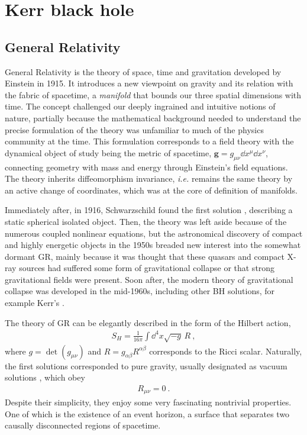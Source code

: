 
\chapter{Kerr black hole} %
\label{Chapter2}


\section{General Relativity}

General Relativity is the theory of space, time and gravitation developed by Einstein in 1915. 
It introduces a new viewpoint on gravity and its relation with the fabric of spacetime, a \emph{manifold} that bounds our three spatial dimensions with time.
The concept challenged our deeply ingrained and intuitive notions of nature, partially because the mathematical background needed to understand the precise formulation of the theory was unfamiliar to much of the physics community at the time.
This formulation corresponds to a field theory with the dynamical object of study being the metric of spacetime, $\bm{g}=g_{\mu\nu} \dd x^\mu \dd x^\nu$, connecting geometry with mass and energy through Einstein's field equations.
The theory inherits diffeomorphism invariance, \emph{i.e.} remains the same theory by an active change of coordinates, which was at the core of definition of manifolds.

Immediately after, in 1916, Schwarzschild found the first solution \cite{Schwarzschild1916}, describing a static spherical isolated object.
Then, the theory was left aside because of the numerous coupled nonlinear equations, but the astronomical discovery of compact and highly energetic objects in the 1950s breaded new interest into the somewhat dormant GR, mainly because it was thought that these quasars and compact X-ray sources had suffered some form of gravitational collapse or that strong gravitational fields were present.
Soon after, the modern theory of gravitational collapse was developed in the mid-1960s, including other BH solutions, for example Kerr's \cite{Kerr1963}.

The theory of GR can be elegantly described in the form of the Hilbert action,
\begin{align}
    S_{H} = \frac{1}{16\pi} \int \dd^4 x \sqrt{-g} \,R ~,
    \label{eq2:actionGR}
\end{align}
where $g=\det(g_{\mu\nu})$ and $R=g_{\alpha\beta} R^{\alpha\beta}$ corresponds to the Ricci scalar.
Naturally, the first solutions corresponded to pure gravity, usually designated as vacuum solutions \cite{Wald2010}, which obey
\begin{align}
    R_{\mu\nu} = 0 ~.
    \label{eq2:vacuumGR}
\end{align}
Despite their simplicity, they enjoy some very fascinating nontrivial properties. 
One of which is the existence of an event horizon, a surface that separates two causally disconnected regions of spacetime.

